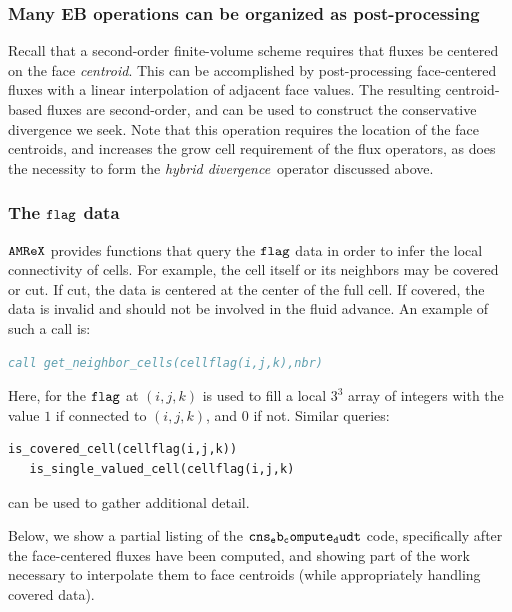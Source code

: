 \subsubsection{Many EB operations can be organized as post-processing}
Recall that a second-order finite-volume scheme requires that fluxes
be centered on the face {\em centroid}.  This can be accomplished by post-processing face-centered fluxes with a linear interpolation
of adjacent face values.  The resulting centroid-based fluxes are second-order, and can be used to construct the conservative
divergence we seek.  Note that this operation requires the location of the face centroids, and increases the grow cell requirement
of the flux operators, as does the necessity to form the {\em hybrid divergence}\ operator discussed above.

\subsubsection{The $\tt{flag}$ data}
$\tt{AMReX}$ provides functions that query the $\tt{flag}$ data in order to infer the local connectivity of cells.  For example,
the cell itself or its neighbors may be covered or cut.  If cut, the data is centered at the center of the full cell.  If covered,
the data is invalid and should not be involved in the fluid advance.  An example of such a call is:

\begin{lstlisting}[language=Fortran]
   call get_neighbor_cells(cellflag(i,j,k),nbr)
\end{lstlisting}

Here, for the $\tt{flag}$ at $(i,j,k)$ is used to fill a local $3^3$ array of integers with the value $1$ if connected to $(i,j,k)$,
and $0$ if not.  Similar queries:

\begin{lstlisting}[language=Fortran]
   is_covered_cell(cellflag(i,j,k))
   is_single_valued_cell(cellflag(i,j,k)
\end{lstlisting}
can be used to gather additional detail.

Below, we show a partial listing of the $\tt{cns_eb_compute_dudt}$ code, specifically after the face-centered fluxes have been computed,
and showing part of the work necessary to interpolate them to face centroids (while appropriately handling covered data).

